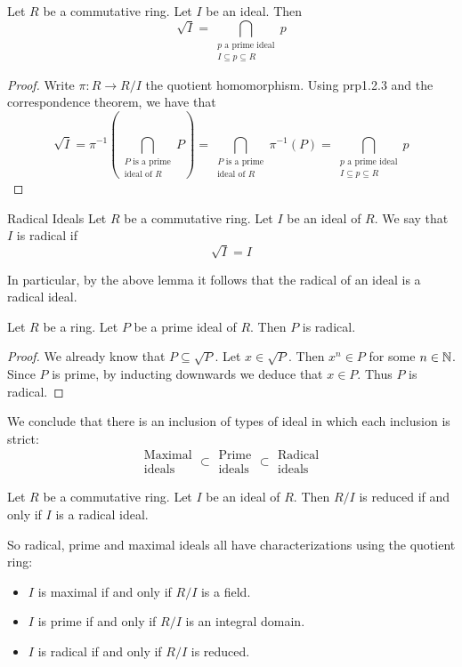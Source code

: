 \documentclass[a4paper]{article}
\begin{document}
\begin{prp}{}{} Let $R$ be a commutative ring. Let $I$ be an ideal. Then $$\sqrt{I}=\bigcap_{\substack{p\text{ a prime ideal}\\I\subseteq p\subseteq R}}p$$ 
\begin{proof}
Write $\pi:R\to R/I$ the quotient homomorphism. Using prp1.2.3 and the correspondence theorem, we have that $$\sqrt{I}=\pi^{-1}\left(\bigcap_{\substack{P\text{ is a prime}\\\text{ideal of }R}}P\right)=\bigcap_{\substack{P\text{ is a prime}\\\text{ideal of }R}}\pi^{-1}(P)=\bigcap_{\substack{p\text{ a prime ideal}\\I\subseteq p\subseteq R}}p$$
\end{proof}
\end{prp}

\begin{defn}{Radical Ideals}{} Let $R$ be a commutative ring. Let $I$ be an ideal of $R$. We say that $I$ is radical if $$\sqrt{I}=I$$
\end{defn}

In particular, by the above lemma it follows that the radical of an ideal is a radical ideal. 

\begin{lmm}{}{} Let $R$ be a ring. Let $P$ be a prime ideal of $R$. Then $P$ is radical. 
\begin{proof}
We already know that $P\subseteq\sqrt{P}$. Let $x\in\sqrt{P}$. Then $x^n\in P$ for some $n\in\mathbb{N}$. Since $P$ is prime, by inducting downwards we deduce that $x\in P$. Thus $P$ is radical. 
\end{proof}
\end{lmm}

We conclude that there is an inclusion of types of ideal in which each inclusion is strict: $$\substack{\text{Maximal}\\\text{ideals}}\subset\substack{\text{Prime}\\\text{ideals}}\subset\substack{\text{Radical}\\\text{ideals}}$$

\begin{prp}{}{} Let $R$ be a commutative ring. Let $I$ be an ideal of $R$. Then $R/I$ is reduced if and only if $I$ is a radical ideal. 
\end{prp}

So radical, prime and maximal ideals all have characterizations using the quotient ring: 
\begin{itemize}
\item $I$ is maximal if and only if $R/I$ is a field. 
\item $I$ is prime if and only if $R/I$ is an integral domain. 
\item $I$ is radical if and only if $R/I$ is reduced. 
\end{itemize}
\end{document}
